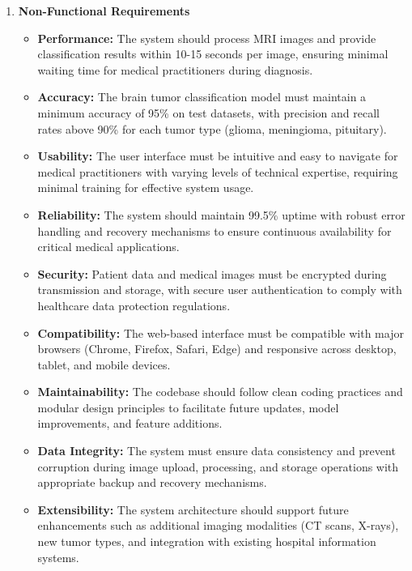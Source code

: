 \begin{enumerate}[label=\roman*.]
    \item \textbf{Non-Functional Requirements}
          \begin{itemize}
              \item \textbf{Performance:} The system should process MRI images and provide classification results within 10-15 seconds per image, ensuring minimal waiting time for medical practitioners during diagnosis.

              \item \textbf{Accuracy:} The brain tumor classification model must maintain a minimum accuracy of 95\% on test datasets, with precision and recall rates above 90\% for each tumor type (glioma, meningioma, pituitary).

              \item \textbf{Usability:} The user interface must be intuitive and easy to navigate for medical practitioners with varying levels of technical expertise, requiring minimal training for effective system usage.

              \item \textbf{Reliability:} The system should maintain 99.5\% uptime with robust error handling and recovery mechanisms to ensure continuous availability for critical medical applications.

              \item \textbf{Security:} Patient data and medical images must be encrypted during transmission and storage, with secure user authentication to comply with healthcare data protection regulations.

              \item \textbf{Compatibility:} The web-based interface must be compatible with major browsers (Chrome, Firefox, Safari, Edge) and responsive across desktop, tablet, and mobile devices.

              \item \textbf{Maintainability:} The codebase should follow clean coding practices and modular design principles to facilitate future updates, model improvements, and feature additions.

              \item \textbf{Data Integrity:} The system must ensure data consistency and prevent corruption during image upload, processing, and storage operations with appropriate backup and recovery mechanisms.

              \item \textbf{Extensibility:} The system architecture should support future enhancements such as additional imaging modalities (CT scans, X-rays), new tumor types, and integration with existing hospital information systems.
          \end{itemize}

\end{enumerate}
